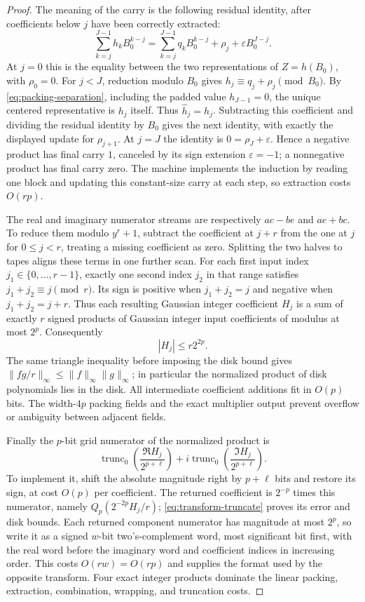 \begin{proof}
The meaning of the carry is the following residual identity, after
coefficients below $j$ have been correctly extracted:
\[
 \sum_{k=j}^{J-1}h_kB_0^{k-j}
 =\sum_{k=j}^{J-1}q_kB_0^{k-j}
       +\rho_j+\varepsilon B_0^{J-j}.
\]
At $j=0$ this is the equality between the two representations of
$Z=h(B_0)$, with
$\rho_0=0$.  For $j<J$, reduction modulo $B_0$ gives
$h_j\equiv q_j+\rho_j\pmod{B_0}$.  By
\eqref{eq:packing-separation}, including the padded value
$h_{J-1}=0$, the unique centered representative is $h_j$ itself.
Thus $\widehat h_j=h_j$.  Subtracting this coefficient and dividing
the residual identity by $B_0$ gives the next identity, with exactly
the displayed update for $\rho_{j+1}$.  At $j=J$ the identity is
$0=\rho_J+\varepsilon$.  Hence a negative product has final carry
$1$, canceled by its sign extension $\varepsilon=-1$; a nonnegative
product has final carry zero.  The machine implements the induction
by reading one block and updating this constant-size carry at each
step, so extraction costs $O(rp)$.

The real and imaginary numerator streams are respectively
$ac-be$ and $ae+bc$.  To reduce them modulo $y^r+1$, subtract the
coefficient at $j+r$ from the one at $j$ for $0\leq j<r$, treating
a missing coefficient as zero.  Splitting the two halves to tapes
aligns these terms in one further scan.  For each first input index
$j_1\in\{0,\ldots,r-1\}$, exactly one second index $j_2$ in that
range satisfies $j_1+j_2\equiv j\pmod r$.  Its sign is positive
when $j_1+j_2=j$ and negative when $j_1+j_2=j+r$.  Thus each
resulting Gaussian integer coefficient $H_j$ is a sum of exactly
$r$ signed products of Gaussian integer input coefficients of
modulus at most $2^p$.  Consequently
\[
       |H_j|\leq r2^{2p}.
\]
The same triangle inequality before imposing the disk bound gives
$\|fg/r\|_\infty\leq\|f\|_\infty\|g\|_\infty$; in particular the
normalized product of disk polynomials lies in the disk.  All
intermediate coefficient additions fit in $O(p)$ bits.  The
width-$4p$ packing fields and the exact multiplier output prevent
overflow or ambiguity between adjacent fields.

Finally the $p$-bit grid numerator of the normalized product is
\[
 \operatorname{trunc}_0\left(\frac{\Re H_j}{2^{p+\ell}}\right)
   +i\operatorname{trunc}_0\left(\frac{\Im H_j}{2^{p+\ell}}\right).
\]
To implement it, shift the absolute magnitude right by $p+\ell$
bits and restore its sign, at cost $O(p)$ per coefficient.  The returned
coefficient is $2^{-p}$ times this numerator, namely
$Q_p(2^{-2p}H_j/r)$; \eqref{eq:transform-truncate} proves its error
and disk bounds. Each returned component numerator has magnitude at
most $2^p$, so write it as a signed $w$-bit two's-complement word,
most significant bit first, with the real word before the imaginary
word and coefficient indices in increasing order. This costs
$O(rw)=O(rp)$ and supplies the format used by the opposite transform.
Four exact integer products dominate the linear
packing, extraction, combination, wrapping, and truncation costs.
\end{proof}

